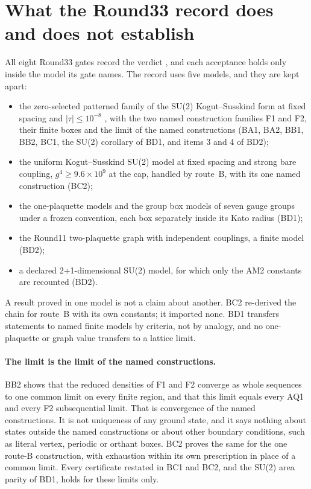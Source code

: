 \section{What the Round33 record does and does not establish}
\label{sec:limits}

All eight Round33 gates record the verdict , and
each acceptance holds only inside the model its gate names. The record uses
five models, and they are kept apart:
\begin{itemize}
\item the zero-selected patterned family of the SU(2) Kogut--Susskind form at
 fixed spacing and $|\tau|\le10^{-8}$ \cite{ks}, with the two named
 construction families F1 and F2, their finite boxes and the limit of the
 named constructions (BA1, BA2, BB1, BB2, BC1, the SU(2) corollary of BD1,
 and items 3 and 4 of BD2);
\item the uniform Kogut--Susskind SU(2) model at fixed spacing and strong bare
 coupling, $g^4\ge9.6\times10^9$ at the cap, handled by route~B, with its one
 named construction (BC2);
\item the one-plaquette models and the group box models of seven gauge
 groups under a frozen convention, each box separately inside its Kato radius
 (BD1);
\item the Round11 two-plaquette graph with independent couplings, a finite
 model \cite{r11} (BD2);
\item a declared 2+1-dimensional SU(2) model, for which only the AM2 constants
 are recounted (BD2).
\end{itemize}
A result proved in one model is not a claim about another. BC2 re-derived the
chain for route~B with its own constants; it imported none. BD1 transfers
statements to named finite models by criteria, not by analogy, and no
one-plaquette or graph value transfers to a lattice limit.

\paragraph{The limit is the limit of the named constructions.} BB2 shows
that the reduced densities of F1 and F2 converge as whole sequences to one
common limit on every finite region, and that this limit equals every AQ1
and every F2 subsequential limit. That is convergence of the named
constructions. It is not uniqueness of any ground state, and it says nothing
about states outside the named constructions or about other boundary
conditions, such as literal vertex, periodic or orthant boxes. BC2 proves the
same for the one route-B construction, with exhaustion within its own
prescription in place of a common limit. Every certificate restated in BC1
and BC2, and the SU(2) area parity of BD1, holds for these limits only.


